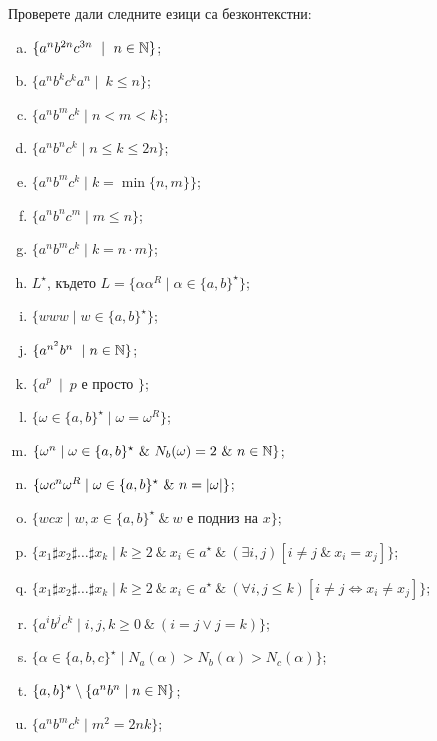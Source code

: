 \begin{problem}
  Проверете дали следните езици са безконтекстни:
  \begin{enumerate}[a)]
  \item
    $\{a^nb^{2n}c^{3n}\ \mid\ n\in\Nat\}$;
  \item
    $\{a^nb^kc^ka^n\mid\ k \leq n\}$;
  \item
    $\{a^nb^mc^k\mid n < m < k\}$;
  \item
    $\{a^nb^nc^k\mid n \leq k \leq 2n\}$;
  \item
    $\{a^nb^mc^k\mid k = \min\{n,m\}\}$;
  \item
    $\{a^nb^nc^m\mid m \leq n\}$;
  \item
    $\{a^nb^mc^k\mid k = n\cdot m\}$;
  \item
    $L^\star$, където
    $L = \{\alpha\alpha^R \mid \alpha \in \{a,b\}^\star\}$;
  \item
    $\{www\mid w\in \{a,b\}^\star\}$;
  \item
    $\{a^{n^2}b^n\ \mid n \in \mathbb{N}\}$;
  \item
    $\{a^p\ \mid\ p\mbox{ е просто }\}$;
  \item
    $\{\omega \in \{a,b\}^\star \mid \omega = \omega^R\}$;
  \item
    $\{\omega^n \mid \omega \in \{a,b\}^\star\ \&\ N_b(\omega) = 2\ \&\ n \in \mathbb{N}\}$;
  \item
    $\{\omega c^n \omega^R \mid \omega \in \{a,b\}^\star\ \&\ n = \vert{\omega}\vert\}$;
  \item
    $\{w c x\mid w,x\in \{a,b\}^\star\ \&\ w\mbox{ е подниз на }x\}$;
  \item
    $\{x_1 \sharp x_2 \sharp \dots \sharp x_k\mid k\geq 2\ \&\ x_i\in a^\star\ \&\ (\exists i,j)[i \neq j\ \&\ x_i = x_j]\}$;
  \item
    $\{x_1 \sharp x_2 \sharp \dots \sharp x_k\mid k\geq 2\ \&\ x_i\in a^\star\ \&\ (\forall i,j \leq k)[i \neq j \iff x_i \neq x_j]\}$;
  \item
    $\{a^ib^jc^k\mid i,j,k\geq 0\ \&\ (i = j \vee j = k)\}$;
  \item
    $\{\alpha \in \{a,b,c\}^\star\mid N_a(\alpha) > N_b(\alpha) > N_c(\alpha)\}$;
  \item
    $\{a,b\}^\star \setminus \{a^nb^n\mid n\in \mathbb{N}\}$;
  \item
    $\{a^nb^mc^k \mid m^2 = 2nk\}$;


\end{enumerate}
\end{problem}
